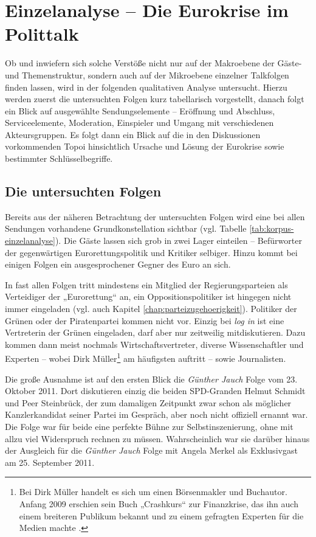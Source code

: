 
\chapter{Einzelanalyse – Die Eurokrise im Polittalk}

Ob und inwiefern sich solche Verstöße nicht nur auf der Makroebene der Gäste- und Themenstruktur, sondern auch auf der Mikroebene einzelner Talkfolgen finden lassen, wird in der folgenden qualitativen Analyse untersucht. Hierzu werden zuerst die untersuchten Folgen kurz tabellarisch vorgestellt, danach folgt ein Blick auf ausgewählte Sendungselemente – Eröffnung und Abschluss, Serviceelemente, Moderation, Einspieler und Umgang mit verschiedenen Akteursgruppen. Es folgt dann ein Blick auf die in den Diskussionen vorkommenden Topoi hinsichtlich Ursache und Lösung der Eurokrise sowie bestimmter Schlüsselbegriffe.

\section{Die untersuchten Folgen}

Bereits aus der näheren Betrachtung der untersuchten Folgen wird eine bei allen Sendungen vorhandene Grundkonstellation sichtbar (vgl. Tabelle \vref{tab:korpus-einzelanalyse}). Die Gäste lassen sich grob in zwei Lager einteilen – Befürworter der gegenwärtigen Eurorettungspolitik und Kritiker selbiger. Hinzu kommt bei einigen Folgen ein ausgesprochener Gegner des Euro an sich.

In fast allen Folgen tritt mindestens ein Mitglied der Regierungsparteien als Verteidiger der „Eurorettung“ an, ein Oppositionspolitiker ist hingegen nicht immer eingeladen (vgl. auch Kapitel \vref{chap:parteizugehoerigkeit}). Politiker der Grünen oder der Piratenpartei kommen nicht vor. Einzig bei \textit{log in} ist eine Vertreterin der Grünen eingeladen, darf aber nur zeitweilig mitdiskutieren. Dazu kommen dann meist nochmals Wirtschaftsvertreter, diverse Wissenschaftler und Experten – wobei Dirk Müller\footnote{Bei Dirk Müller handelt es sich um einen Börsenmakler und Buchautor. Anfang 2009 erschien sein Buch „Crashkurs“ zur Finanzkrise, das ihn auch einem breiteren Publikum bekannt und zu einem gefragten Experten für die Medien machte \parencite{gierschCrashkursMisterDax2009}.} am häufigsten auftritt – sowie Journalisten.

Die große Ausnahme ist auf den ersten Blick die \textit{Günther Jauch} Folge vom 23. Oktober 2011. Dort diskutieren einzig die beiden SPD-Granden Helmut Schmidt und Peer Steinbrück, der zum damaligen Zeitpunkt zwar schon als möglicher Kanzlerkandidat seiner Partei im Gespräch, aber noch nicht offiziell ernannt war. Die Folge war für beide eine perfekte Bühne zur Selbstinszenierung, ohne mit allzu viel Widerspruch rechnen zu müssen. Wahrscheinlich war sie darüber hinaus der Ausgleich für die \textit{Günther Jauch} Folge mit Angela Merkel als Exklusivgast am 25. September 2011.

